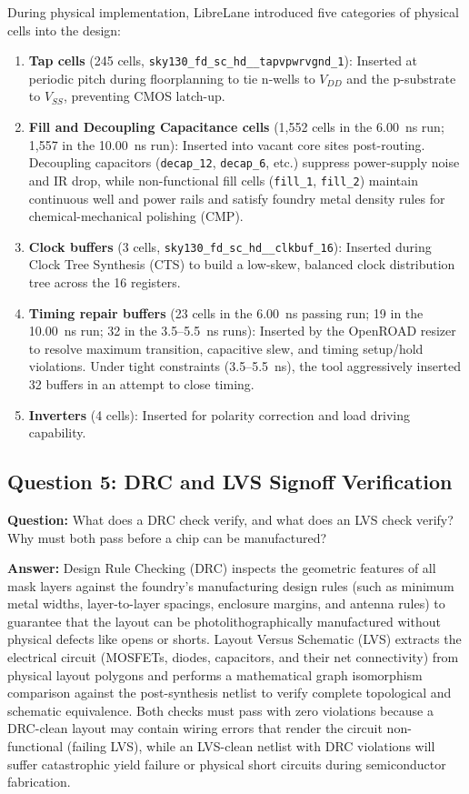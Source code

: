 \documentclass[12pt]{article}
\begin{document}
{During physical implementation, LibreLane introduced five categories of physical cells into the design:
\begin{enumerate}
    \item \textbf{Tap cells} (245 cells, \texttt{sky130\_fd\_sc\_hd\_\_tapvpwrvgnd\_1}): Inserted at periodic pitch during floorplanning to tie n-wells to $V_{DD}$ and the p-substrate to $V_{SS}$, preventing CMOS latch-up.
    \item \textbf{Fill and Decoupling Capacitance cells} (1,552 cells in the 6.00~ns run; 1,557 in the 10.00~ns run): Inserted into vacant core sites post-routing. Decoupling capacitors (\texttt{decap\_12}, \texttt{decap\_6}, etc.) suppress power-supply noise and IR drop, while non-functional fill cells (\texttt{fill\_1}, \texttt{fill\_2}) maintain continuous well and power rails and satisfy foundry metal density rules for chemical-mechanical polishing (CMP).
    \item \textbf{Clock buffers} (3 cells, \texttt{sky130\_fd\_sc\_hd\_\_clkbuf\_16}): Inserted during Clock Tree Synthesis (CTS) to build a low-skew, balanced clock distribution tree across the 16 registers.
    \item \textbf{Timing repair buffers} (23 cells in the 6.00~ns passing run; 19 in the 10.00~ns run; 32 in the 3.5--5.5~ns runs): Inserted by the OpenROAD resizer to resolve maximum transition, capacitive slew, and timing setup/hold violations. Under tight constraints (3.5--5.5~ns), the tool aggressively inserted 32 buffers in an attempt to close timing.
    \item \textbf{Inverters} (4 cells): Inserted for polarity correction and load driving capability.
\end{enumerate}

\subsection{Question 5: DRC and LVS Signoff Verification}
\textbf{Question:} What does a DRC check verify, and what does an LVS check verify? Why must both pass before a chip can be manufactured?

\textbf{Answer:} 
Design Rule Checking (DRC) inspects the geometric features of all mask layers against the foundry's manufacturing design rules (such as minimum metal widths, layer-to-layer spacings, enclosure margins, and antenna rules) to guarantee that the layout can be photolithographically manufactured without physical defects like opens or shorts. Layout Versus Schematic (LVS) extracts the electrical circuit (MOSFETs, diodes, capacitors, and their net connectivity) from physical layout polygons and performs a mathematical graph isomorphism comparison against the post-synthesis netlist to verify complete topological and schematic equivalence. Both checks must pass with zero violations because a DRC-clean layout may contain wiring errors that render the circuit non-functional (failing LVS), while an LVS-clean netlist with DRC violations will suffer catastrophic yield failure or physical short circuits during semiconductor fabrication.

}
\end{document}
